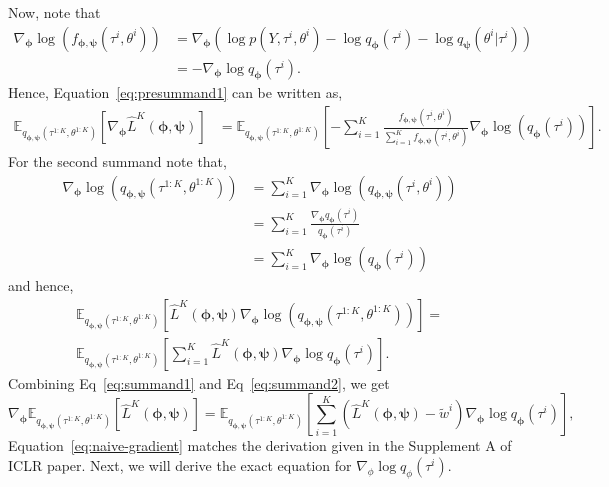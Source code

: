 \documentclass{article}
\newcommand{\E}{\mathbb{E}}
\begin{document}
Now, note that
\begin{align*}
    \nabla_{\bm{\phi}} \log(f_{\bm{\phi}, \bm{\psi}}(\tau^i, \theta^i)) &= \nabla_{\bm{\phi}} (\log p(Y, \tau^i, \theta^i) - \log q_{\bm{\phi}}(\tau^i) - \log q_{\bm{\psi}}(\theta^i | \tau^i)) \\
    &= - \nabla_{\bm{\phi}} \log q_{\bm{\phi}}(\tau^i).
\end{align*}
Hence, Equation~\ref{eq:presummand1} can be written as,
\begin{align}\label{eq:summand1}
    \E_{q_{\bm{\phi}, \bm{\psi}}(\tau^{1:K}, \theta^{1:K})}[\nabla_{\bm{\phi}} \hat{L}^K(\bm{\phi}, \bm{\psi})] &= \E_{q_{\bm{\phi}, \bm{\psi}}(\tau^{1:K}, \theta^{1:K})}\left[- \sum_{i=1}^{K} \frac{f_{\bm{\phi}, \bm{\psi}}(\tau^i, \theta^i) }{\sum\limits_{i=1}^{K} f_{\bm{\phi}, \bm{\psi}}(\tau^i, \theta^i)} \nabla_{\bm{\phi}} \log(q_{\bm{\phi}}(\tau^i))\right].
\end{align}
For the second summand note that,
\begin{align*}
    \nabla_{\bm{\phi}} \log(q_{\bm{\phi}, \bm{\psi}}(\tau^{1:K}, \theta^{1:K})) &= \sum\limits_{i=1}^{K} \nabla_{\bm{\phi}} \log(q_{\bm{\phi},\bm{\psi}}(\tau^{i}, \theta^{i})) \\
    &= \sum\limits_{i=1}^{K} \frac{\nabla_{\bm{\phi}} q_{\bm{\phi}}(\tau^{i})}{q_{\bm{\phi}}(\tau^{i})} \\
    &= \sum\limits_{i=1}^{K} \nabla_{\bm{\phi}} \log(q_{\bm{\phi}}(\tau^{i}))
\end{align*}
and hence,
\begin{multline}\label{eq:summand2}
    \E_{q_{\bm{\phi}, \bm{\psi}}(\tau^{1:K}, \theta^{1:K})}[\hat{L}^K(\bm{\phi}, \bm{\psi}) \nabla_{\bm{\phi}} \log(q_{\bm{\phi}, \bm{\psi}}(\tau^{1:K}, \theta^{1:K}))] = \\
    \E_{q_{\bm{\phi}, \bm{\psi}}(\tau^{1:K},\theta^{1:K})}\left[\sum\limits_{i=1}^{K} \hat{L}^K(\bm{\phi}, \bm{\psi}) \nabla_{\bm{\phi}} \log q_{\bm{\phi}}(\tau^{i})\right].
\end{multline}
Combining Eq~\ref{eq:summand1} and Eq~\ref{eq:summand2}, we get
\begin{equation}\label{eq:naive-gradient}
    \nabla_{\bm{\phi}} \E_{q_{\bm{\phi}, \bm{\psi}}(\tau^{1:K},\theta^{1:K})}[\hat{L}^K(\bm{\phi}, \bm{\psi})] = \E_{q_{\bm{\phi}, \bm{\psi}}(\tau^{1:K},\theta^{1:K})}\left[\sum\limits_{i=1}^{K} (\hat{L}^K(\bm{\phi}, \bm{\psi}) - \tilde{w}^i) \nabla_{\bm{\phi}} \log q_{\bm{\phi}}(\tau^i) \right],
\end{equation}
Equation~\ref{eq:naive-gradient} matches the derivation given in the Supplement A of ICLR paper.
Next, we will derive the exact equation for $\nabla_{\phi} \log q_{\phi}(\tau^i)$.
\end{document}
